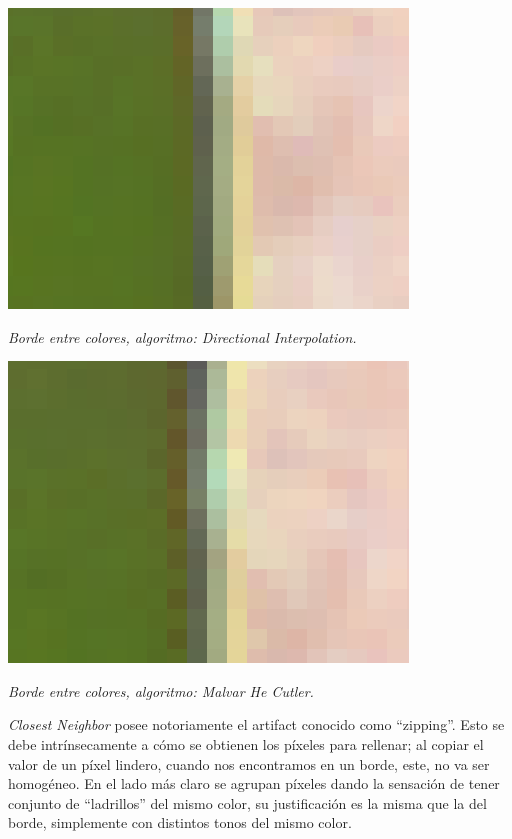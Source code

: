 	\begin{center}
		\includegraphics[scale=.5]{../enunciado/images_files/cualitativo/pico_loro_directional.png}
		\vspace{2pt}
		\par
		\footnotesize\textit{Borde entre colores, algoritmo: Directional Interpolation.}
	\end{center}


	\begin{center}
		\includegraphics[scale=.5]{../enunciado/images_files/cualitativo/pico_loro_malvar.png}
		\vspace{2pt}
		\par
		\footnotesize\textit{Borde entre colores, algoritmo: Malvar He Cutler.}
	\end{center}

 \textit{Closest Neighbor}  posee notoriamente el artifact conocido como ``zipping''. Esto se debe intrínsecamente a cómo se obtienen los píxeles para rellenar; al copiar el valor de un píxel lindero, cuando nos encontramos en un borde, este, no va ser homogéneo. En el lado más claro se agrupan píxeles dando la sensación de tener conjunto de ``ladrillos'' del mismo color, su justificación es la misma que la del borde, simplemente con distintos tonos del mismo color.

